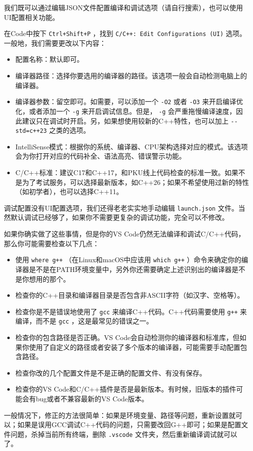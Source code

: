 我们既可以通过编辑JSON文件配置编译和调试选项（请自行搜索），也可以使用UI配置相关功能。

在Code中按下 \verb|Ctrl+Shift+P| ，找到 \verb|C/C++: Edit Configurations (UI)| 选项。一般地，我们需要更改以下内容：
\begin{itemize}
  \item 配置名称：默认即可。
  \item 编译器路径：选择你要选用的编译器的路径。该选项一般会自动检测电脑上的编译器。
  \item 编译器参数：留空即可。如需要，可以添加一个 \verb|-O2| 或者 \verb|-O3| 来开启编译优化，或者添加一个 \verb|-g| 来开启调试信息。但是， \verb|-g| 会严重拖慢编译速度，因此建议只在调试时开启。另，如果想使用较新的C++特性，也可以加上 \verb|--std=c++23| 之类的选项。
  \item IntelliSense模式：根据你的系统、编译器、CPU架构选择对应的模式。该选项会为你打开对应的代码补全、语法高亮、错误警示功能。
  \item C/C++标准：建议C17和C++17，和PKU线上代码检查的标准一致。如果不是为了考试服务，可以选择最新版本，如C++26；如果不希望使用过新的特性（如初学者），也可以选择C++11。
\end{itemize}

调试配置没有UI配置选项，我们还得老老实实地手动编辑 \verb|launch.json| 文件。当然默认调试已经够了，如果你不需要更复杂的调试功能，完全可以不修改。

如果你确实做了这些事情，但是你的VS Code仍然无法编译和调试C/C++代码，那么你可能需要检查以下几点：
\begin{itemize}
  \item 使用 \texttt{where g++} （在Linux和macOS中应该用 \texttt{which g++} ）命令来确定你的编译器是不是在PATH环境变量中，另外你还需要确定上述识别出的编译器是不是你想用的那个。
  \item 检查你的C++目录和编译器目录是否包含非ASCII字符（如汉字、空格等）。
  \item 检查你是不是错误地使用了 \verb|gcc| 来编译C++代码。C++代码需要使用 \verb|g++| 来编译，而不是 \verb|gcc| ，这是最常见的错误之一。
  \item 检查你的包含路径是否正确。VS Code会自动检测你的编译器和标准库，但如果你使用了自定义的路径或者安装了多个版本的编译器，可能需要手动配置包含路径。
  \item 检查你改的几个配置文件是不是正确的配置文件、有没有保存。
  \item 检查你的VS Code和C/C++插件是否是最新版本。有时候，旧版本的插件可能会有bug或者不兼容最新的VS Code版本。
\end{itemize}
一般情况下，修正的方法很简单：如果是环境变量、路径等问题，重新设置就可以；如果是误用GCC调试C++代码的问题，只需要改回G++即可；如果是配置文件问题，杀掉当前所有终端，删除 \verb|.vscode| 文件夹，然后重新编译调试就可以了。
